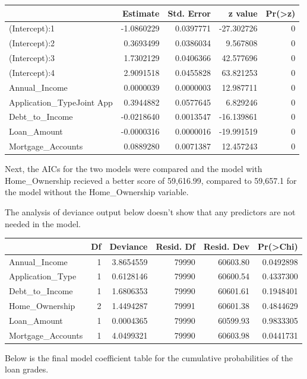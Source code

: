 \documentclass[11pt,]{article}
\begin{document}
\begin{longtable}[]{@{}lrrrr@{}}
\toprule
& Estimate & Std. Error & z value &
Pr(\textgreater{}\textbar{}z\textbar{})\tabularnewline
\midrule
\endhead
(Intercept):1 & -1.0860229 & 0.0397771 & -27.302726 & 0\tabularnewline
(Intercept):2 & 0.3693499 & 0.0386034 & 9.567808 & 0\tabularnewline
(Intercept):3 & 1.7302129 & 0.0406366 & 42.577696 & 0\tabularnewline
(Intercept):4 & 2.9091518 & 0.0455828 & 63.821253 & 0\tabularnewline
Annual\_Income & 0.0000039 & 0.0000003 & 12.987711 & 0\tabularnewline
Application\_TypeJoint App & 0.3944882 & 0.0577645 & 6.829246 &
0\tabularnewline
Debt\_to\_Income & -0.0218640 & 0.0013547 & -16.139861 &
0\tabularnewline
Loan\_Amount & -0.0000316 & 0.0000016 & -19.991519 & 0\tabularnewline
Mortgage\_Accounts & 0.0889280 & 0.0071387 & 12.457243 &
0\tabularnewline
\bottomrule
\end{longtable}

Next, the AICs for the two models were compared and the model with
Home\_Ownership recieved a better score of 59,616.99, compared to
59,657.1 for the model without the Home\_Ownership variable.

The analysis of deviance output below doesn't show that any predictors
are not needed in the model.

\begin{longtable}[]{@{}lrrrrr@{}}
\toprule
& Df & Deviance & Resid. Df & Resid. Dev &
Pr(\textgreater{}Chi)\tabularnewline
\midrule
\endhead
Annual\_Income & 1 & 3.8654559 & 79990 & 60603.80 &
0.0492898\tabularnewline
Application\_Type & 1 & 0.6128146 & 79990 & 60600.54 &
0.4337300\tabularnewline
Debt\_to\_Income & 1 & 1.6806353 & 79990 & 60601.61 &
0.1948401\tabularnewline
Home\_Ownership & 2 & 1.4494287 & 79991 & 60601.38 &
0.4844629\tabularnewline
Loan\_Amount & 1 & 0.0004365 & 79990 & 60599.93 &
0.9833305\tabularnewline
Mortgage\_Accounts & 1 & 4.0499321 & 79990 & 60603.98 &
0.0441731\tabularnewline
\bottomrule
\end{longtable}

Below is the final model coefficient table for the cumulative
probabilities of the loan grades.
\end{document}
